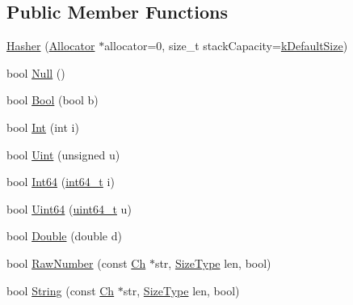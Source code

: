 \subsection*{Public Member Functions}
\begin{DoxyCompactItemize}
\item 
\mbox{\hyperlink{classrapidjson_1_1internal_1_1_hasher_aa4c5e8b9b7c8702f65a2a0e0b8343f4e}{Hasher}} (\mbox{\hyperlink{classrapidjson_1_1_allocator}{Allocator}} $\ast$allocator=0, size\+\_\+t stack\+Capacity=\mbox{\hyperlink{classrapidjson_1_1internal_1_1_hasher_aeb47a8003b45accc29ad48ecf137965a}{k\+Default\+Size}})
\item 
bool \mbox{\hyperlink{classrapidjson_1_1internal_1_1_hasher_a94b14e578a8a6a531f13b17dc57e96c6}{Null}} ()
\item 
bool \mbox{\hyperlink{classrapidjson_1_1internal_1_1_hasher_a327bd773c59c8ffca61ef34788e6a412}{Bool}} (bool b)
\item 
bool \mbox{\hyperlink{classrapidjson_1_1internal_1_1_hasher_a1c62b6e8330e4bf651fac9832502db54}{Int}} (int i)
\item 
bool \mbox{\hyperlink{classrapidjson_1_1internal_1_1_hasher_ab225892e08e03fd8a80b47dbffc8eba5}{Uint}} (unsigned u)
\item 
bool \mbox{\hyperlink{classrapidjson_1_1internal_1_1_hasher_a59633b0064bcd54aac31b8459c78cd34}{Int64}} (\mbox{\hyperlink{stdint_8h_a414156feea104f8f75b4ed9e3121b2f6}{int64\+\_\+t}} i)
\item 
bool \mbox{\hyperlink{classrapidjson_1_1internal_1_1_hasher_a011883d06b03048ac3e6a2685e84baf5}{Uint64}} (\mbox{\hyperlink{stdint_8h_aec6fcb673ff035718c238c8c9d544c47}{uint64\+\_\+t}} u)
\item 
bool \mbox{\hyperlink{classrapidjson_1_1internal_1_1_hasher_af4aca7bf1ad1e18ff8a29da3d3473493}{Double}} (double d)
\item 
bool \mbox{\hyperlink{classrapidjson_1_1internal_1_1_hasher_a6eb1fd7bd663e245e8df1db9fe6aff50}{Raw\+Number}} (const \mbox{\hyperlink{classrapidjson_1_1internal_1_1_hasher_ae583d393fe48a90f9369f1fb5e488ab9}{Ch}} $\ast$str, \mbox{\hyperlink{namespacerapidjson_a44eb33eaa523e36d466b1ced64b85c84}{Size\+Type}} len, bool)
\item 
bool \mbox{\hyperlink{classrapidjson_1_1internal_1_1_hasher_aced1f3880cf976d0a8844451bfe1b817}{String}} (const \mbox{\hyperlink{classrapidjson_1_1internal_1_1_hasher_ae583d393fe48a90f9369f1fb5e488ab9}{Ch}} $\ast$str, \mbox{\hyperlink{namespacerapidjson_a44eb33eaa523e36d466b1ced64b85c84}{Size\+Type}} len, bool)

\end{DoxyCompactItemize}
